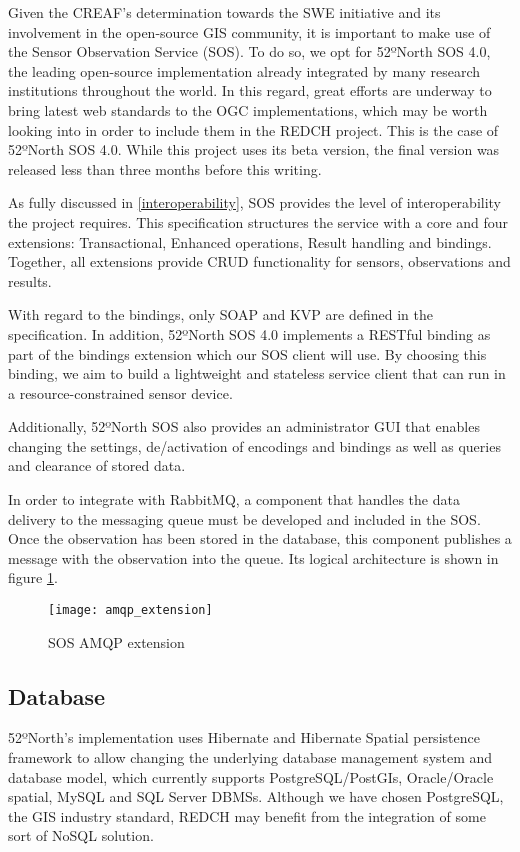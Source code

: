 Given the CREAF's determination towards the SWE initiative and its involvement in  the open-source GIS community, it is important to make use of the Sensor Observation Service (SOS). To do so, we opt for 52ºNorth SOS 4.0, the leading open-source implementation already integrated by many research institutions throughout the world. In this regard, great efforts are underway to bring latest web standards to the OGC implementations, which may be worth looking into in order to include them in the REDCH project. This is the case of 52ºNorth SOS 4.0. While this project uses its beta version, the final version was released less than three months before this writing.

As fully discussed in \ref{interoperability}, SOS provides the level of interoperability the project requires. This specification structures the service with a core and four extensions: Transactional, Enhanced operations, Result handling and bindings. Together, all extensions provide CRUD functionality for sensors, observations and results.

With regard to the bindings, only SOAP and KVP are defined in the specification. In addition, 52ºNorth SOS 4.0 implements a RESTful binding as part of the bindings extension which our SOS client will use. By choosing this binding, we aim to build a lightweight and stateless service client that can run in a resource-constrained sensor device.

Additionally, 52ºNorth SOS also provides an administrator GUI that enables changing the settings, de/activation of encodings and bindings as well as queries and clearance of stored data.

In order to integrate with RabbitMQ, a component that handles the data delivery to the messaging queue must be developed and included in the SOS. Once the observation has been stored in the database, this component publishes a message with the observation into the queue. Its logical architecture is shown in figure \ref{fig:amqp_extension}.

\begin{figure}[p]
	\centering
	\texttt{[image: amqp\_extension]}
	\caption{SOS AMQP extension}
	\label{fig:amqp_extension}
\end{figure}

\subsection{Database}

52ºNorth's implementation uses Hibernate and Hibernate Spatial persistence framework to allow changing the underlying database management system and database model, which currently supports PostgreSQL/PostGIs, Oracle/Oracle spatial, My\-SQL and SQL Server DBMSs. Although we have chosen PostgreSQL, the GIS industry standard, REDCH may benefit from the integration of some sort of NoSQL solution.

